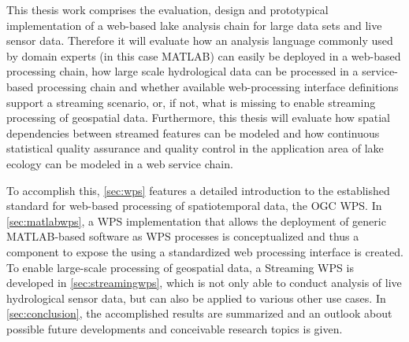 This thesis work comprises the evaluation, design and prototypical implementation of a web-based lake analysis chain for large data sets and live sensor data. Therefore it will evaluate how an analysis language commonly used by domain experts (in this case MATLAB) can easily be deployed in a web-based processing chain, how large scale hydrological data can be processed in a service-based processing chain and whether available web-processing interface definitions support a streaming scenario, or, if not, what is missing to enable streaming processing of geospatial data. Furthermore, this thesis will evaluate how spatial dependencies between streamed features can be modeled and how continuous statistical quality assurance and quality control in the application area of lake ecology can be modeled in a web service chain.

To accomplish this, \cref{sec:wps} features a detailed introduction to the established standard for web-based processing of spatiotemporal data, the OGC \acl{WPS}. In \cref{sec:matlabwps}, a WPS implementation that allows the deployment of generic MATLAB-based software as WPS processes is conceptualized and thus a component to expose the \la using a standardized web processing interface is created. To enable large-scale processing of geospatial data, a Streaming WPS is developed in \cref{sec:streamingwps}, which is not only able to conduct analysis of live hydrological sensor data, but can also be applied to various other use cases. In \cref{sec:conclusion}, the accomplished results are summarized and an outlook about possible future developments and conceivable research topics is given.

